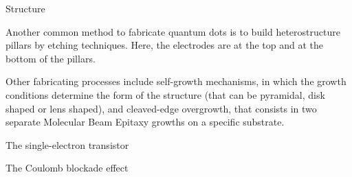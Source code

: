 \documentclass[10pt, compress, usetitleprogressbar, protectframetitle, handout]{beamer}
\begin{document}
\begin{frame}{Structure}
{		Another common method to fabricate quantum dots is to build heterostructure pillars by etching techniques. Here, the electrodes are at the top and at the bottom of the pillars.

		Other fabricating processes include self-growth mechanisms, in which the growth conditions determine the form of the structure (that can be pyramidal, disk shaped or lens shaped), and cleaved-edge overgrowth, that consists in two separate Molecular Beam Epitaxy growths on a specific substrate.
	}
	
\end{frame}

\begin{versionLONG}

\begin{frame}{The single-electron transistor}

	
	
	
	
\end{frame}

\begin{frame}{The Coulomb blockade effect}


\end{frame}
\end{versionLONG}
\end{document}
